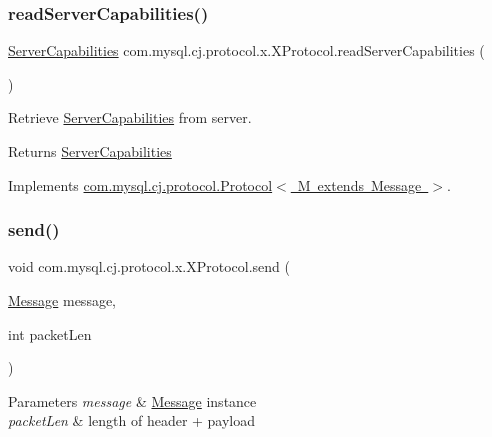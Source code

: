 \subsubsection{\texorpdfstring{read\+Server\+Capabilities()}{readServerCapabilities()}}
{\footnotesize\ttfamily \mbox{\hyperlink{interfacecom_1_1mysql_1_1cj_1_1protocol_1_1_server_capabilities}{Server\+Capabilities}} com.\+mysql.\+cj.\+protocol.\+x.\+X\+Protocol.\+read\+Server\+Capabilities (\begin{DoxyParamCaption}{ }\end{DoxyParamCaption})}

Retrieve \mbox{\hyperlink{interfacecom_1_1mysql_1_1cj_1_1protocol_1_1_server_capabilities}{Server\+Capabilities}} from server.

\begin{DoxyReturn}{Returns}
\mbox{\hyperlink{interfacecom_1_1mysql_1_1cj_1_1protocol_1_1_server_capabilities}{Server\+Capabilities}} 
\end{DoxyReturn}


Implements \mbox{\hyperlink{interfacecom_1_1mysql_1_1cj_1_1protocol_1_1_protocol_ac7608c87247ae3467a9f1e3e8c254042}{com.\+mysql.\+cj.\+protocol.\+Protocol$<$ M extends Message $>$}}.

\mbox{\label{classcom_1_1mysql_1_1cj_1_1protocol_1_1x_1_1_x_protocol_ac6e989e8d119f8c1efd0fda253199727}} 
\subsubsection{\texorpdfstring{send()}{send()}}
{\footnotesize\ttfamily void com.\+mysql.\+cj.\+protocol.\+x.\+X\+Protocol.\+send (\begin{DoxyParamCaption}\item[{\mbox{\hyperlink{interfacecom_1_1mysql_1_1cj_1_1protocol_1_1_message}{Message}}}]{message,  }\item[{int}]{packet\+Len }\end{DoxyParamCaption})}


\begin{DoxyParams}{Parameters}
{\em message} & \mbox{\hyperlink{interfacecom_1_1mysql_1_1cj_1_1protocol_1_1_message}{Message}} instance \\
\hline
{\em packet\+Len} & length of header + payload \\
\hline
\end{DoxyParams}


